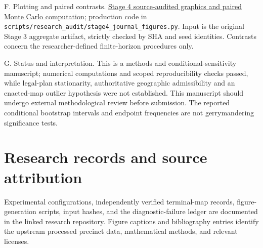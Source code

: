 \documentclass[
  10pt,
]{article}
\begin{document}
F. Plotting and paired contrasts.
\href{https://github.com/DjokovicMan22/Gerrymandering-Project/actions/runs/39203488689}{Stage
4 source-audited graphics and paired Monte Carlo computation};
production code in
\texttt{scripts/research\_audit/stage4\_journal\_figures.py}. Input is
the original Stage 3 aggregate artifact, strictly checked by SHA and
seed identities. Contrasts concern the researcher-defined finite-horizon
procedures only.

G. Status and interpretation. This is a methods and
conditional-sensitivity manuscript; numerical computations and scoped
reproducibility checks passed, while legal-plan stationarity,
authoritative geographic admissibility and an enacted-map outlier
hypothesis were not established. This manuscript should undergo external
methodological review before submission. The reported conditional
bootstrap intervals and endpoint frequencies are not gerrymandering
significance tests.


\section*{Research records and source attribution}
Experimental configurations, independently verified terminal-map records, figure-generation scripts, input hashes, and the diagnostic-failure ledger are documented in the linked research repository. Figure captions and bibliography entries identify the upstream processed precinct data, mathematical methods, and relevant licenses.
\end{document}
